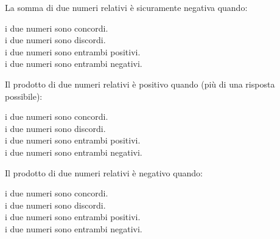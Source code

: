 \newpage %

\begin{esercizio}
La somma di due numeri relativi è sicuramente negativa quando:
 \begin{multicols}{2}
 \noindent
 \boxA\enspace i due numeri sono concordi.\\
 \boxB\enspace i due numeri sono discordi.\\
 \boxC\enspace i due numeri sono entrambi positivi.\\
 \boxD\enspace i due numeri sono entrambi negativi.
 \end{multicols}
\end{esercizio}

\begin{esercizio}
Il prodotto di due numeri relativi è positivo quando (più di una risposta 
possibile):
 \begin{multicols}{2}
 \noindent
 \boxA\enspace i due numeri sono concordi.\\
 \boxB\enspace i due numeri sono discordi.\\
 \boxC\enspace i due numeri sono entrambi positivi.\\
 \boxD\enspace i due numeri sono entrambi negativi.
 \end{multicols}
\end{esercizio}

\begin{esercizio}
Il prodotto di due numeri relativi è negativo quando:
 \begin{multicols}{2}
 \noindent
 \boxA\enspace i due numeri sono concordi.\\
 \boxB\enspace i due numeri sono discordi.\\
 \boxC\enspace i due numeri sono entrambi positivi.\\
 \boxD\enspace i due numeri sono entrambi negativi.
 \end{multicols}
\end{esercizio}

